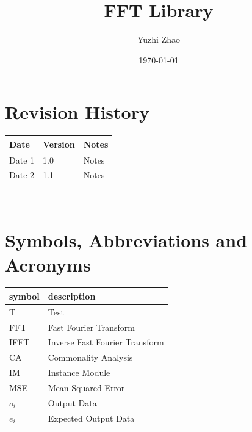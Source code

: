 \documentclass[12pt, titlepage]{article}
\begin{document}
\title{FFT Library} 
\author{Yuzhi Zhao}
\date{\today}
	
\maketitle


\section{Revision History}

\begin{tabularx}{\textwidth}{p{3cm}p{2cm}X}
\toprule {\bf Date} & {\bf Version} & {\bf Notes}\\
\midrule
Date 1 & 1.0 & Notes\\
Date 2 & 1.1 & Notes\\
\bottomrule
\end{tabularx}

~\newpage

\section{Symbols, Abbreviations and Acronyms}

\renewcommand{\arraystretch}{1.2}
\begin{tabular}{l l} 
  \toprule		
  \textbf{symbol} & \textbf{description}\\
  \midrule 
  T & Test\\
  FFT & Fast Fourier Transform\\
IFFT & Inverse Fast Fourier Transform\\
CA & Commonality Analysis\\
IM & Instance Module\\
MSE & Mean Squared Error\\
$o_i $ & Output Data\\
$e_i$ & Expected Output Data\\
  \bottomrule
\end{tabular}\\

\newpage

\tableofcontents

\listoftables


\listoffigures

\newpage

\end{document}
